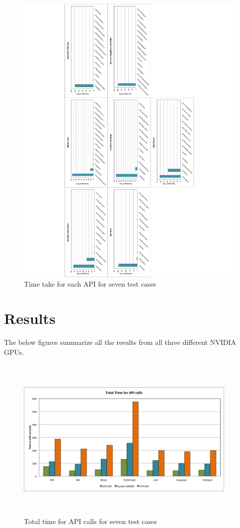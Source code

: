 \documentclass[paper=a4, fontsize=11pt]{scrartcl}
\numberwithin{equation}{section}		%
\numberwithin{figure}{section}			%
\numberwithin{table}{section}				%
\begin{document}
\begin{figure}[!h]
\centering
\includegraphics[scale=0.6]{../imgs/m6000.pdf}
\caption{Time take for each API for seven test cases}
\label{fig:6000}
\end{figure}

\newpage
\section{Results}

The below figures summarize all the results from all three different NVIDIA GPUs. 

\begin{figure}[!h]
\centering
\includegraphics[width=0.95\textwidth,height=8cm]{../imgs/api_calls.png}
\caption{Total time for API calls for seven test cases}
\label{fig:totalAPI}
\end{figure}
\end{document}
